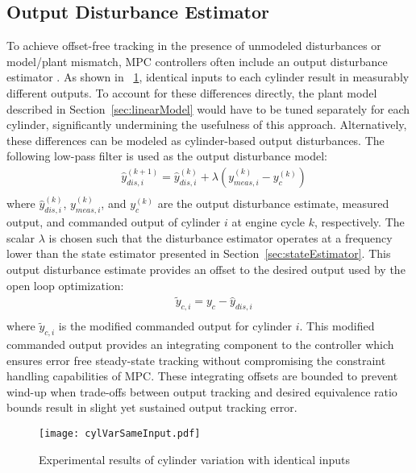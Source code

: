 \subsection{Output Disturbance Estimator}
To achieve offset-free tracking in the presence of unmodeled disturbances or model/plant mismatch, MPC controllers often include an output disturbance estimator \cite{Pannocchia2007}. As shown in \figurename~\ref{fig:cylVarSameInput}, identical inputs to each cylinder result in measurably different outputs. To account for these differences directly, the plant model described in Section~\ref{sec:linearModel} would have to be tuned separately for each cylinder, significantly undermining the usefulness of this approach. Alternatively, these differences can be modeled as cylinder-based output disturbances. The following low-pass filter is used as the output disturbance model:
\begin{equation}
\begin{aligned}
& \hat{y}_{dis,i}^{(k+1)} = \hat{y}_{dis,i}^{(k)} + \lambda(y_{meas,i}^{(k)} - y_{c}^{(k)})\label{eq:outputDisModel}\\
\end{aligned}
\end{equation}
where $\hat{y}_{dis,i}^{(k)}$, $y_{meas,i}^{(k)}$, and $y_{c}^{(k)}$ are the output disturbance estimate, measured output, and commanded output of cylinder $i$ at engine cycle $k$, respectively. The scalar $\lambda$ is chosen such that the disturbance estimator operates at a frequency lower than the state estimator presented in Section~\ref{sec:stateEstimator}. This output disturbance estimate provides an offset to the desired output used by the open loop optimization:
\begin{equation}
\begin{aligned}
& \tilde{y}_{c,i} = y_c - \hat{y}_{dis,i}\label{eq:modCmdOutput}\\
\end{aligned}
\end{equation}
where $\tilde{y}_{c,i}$ is the modified commanded output for cylinder $i$. This modified commanded output provides an integrating component to the controller which ensures error free steady-state tracking without compromising the constraint handling capabilities of MPC. These integrating offsets are bounded to prevent wind-up when trade-offs between output tracking and desired equivalence ratio bounds result in slight yet sustained output tracking error.
\begin{figure}
\centering
\texttt{[image: cylVarSameInput.pdf]}
\caption{Experimental results of cylinder variation with identical inputs}
\label{fig:cylVarSameInput}
\end{figure}
